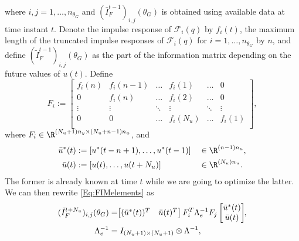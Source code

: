 \documentclass{ifacconf}
\begin{document}
where $i,j = 1, \ldots, n_{\theta_G}$ and $ (\bar{I}_F^{t-1})_{i,j}(\theta_G)$ is obtained using available data at time instant $t$.
Denote the impulse response of $\mathcal{F}_i(q)$ by $f_i(t)$, the maximum length of the truncated impulse responses of $\mathcal{F}_i(q)$ for $i = 1, \ldots, n_{\theta_G}$ by $n$, and define $(\tilde{I}_F^{t-1})_{i,j}(\theta_G)$ as the part of the information matrix depending on the future values of $u(t)$. Define
\begin{equation} \label{Eq:F_i}
F_i :=
		\begin{bmatrix}
			f_i(n)  &  f_i(n-1) &   \ldots    &   f_i(1)     			    			&   \ldots 		& 0 \\
				0    &   f_i(n)  &    \ldots    &   f_i(2)     			    			&   \ldots 		& 0 \\
			\vdots &  \vdots  &    \ddots   &   \vdots   			   			&   \ddots 	   & \vdots\\
				0    &    0       &   \ldots    &   f_i(N_u)     		   			&   \ldots 		   & f_i(1) \\
		\end{bmatrix},
\end{equation}
where $F_i \in \R^{  (N_u+1)n_y  \times  (N_u+n-1)n_u  }$, and
\vspace{-0.2cm}
\begin{eqnarray}
\label{InputVector}
\begin{split}
\bar{u}^*(t) &:= [u^*(t-n+1), \ldots,u^*(t-1)] &&\in \R^{(n-1)n_u},\\
\bar{u}(t)     &:= [u(t), \ldots, u(t+N_u) ] &&\in \R^{(N_u)n_u}.
\end{split}
\end{eqnarray}
The former is already known at time $t$ while we are going to optimize the latter. We can then rewrite \eqref{Eq:FIMelements} as
\vspace{-0.2cm}
\begin{eqnarray}
\begin{split}
(\tilde{I}_F^{t+N_u})_{i,j}(\theta_G) &= \hspace{-0.1cm} \begin{bmatrix}
													(\bar{u}^*(t))^T & \bar{u}(t)^T
													\end{bmatrix} F_i^T \Lambda_e^{-1}F_j
													\begin{bmatrix}
													\bar{u}^*(t) \\
													\bar{u}(t)
													\end{bmatrix}\hspace{-0.1cm},\\
\Lambda_e^{-1} &= I_{(N_u+1)\times(N_u+1)} \otimes \Lambda^{-1},
\end{split}
\end{eqnarray}
\end{document}
